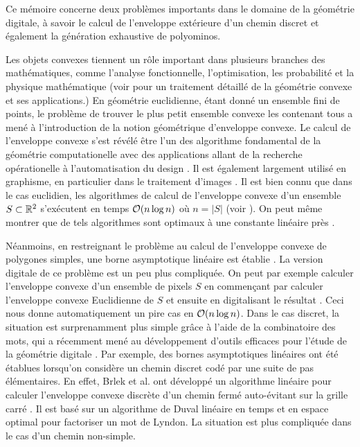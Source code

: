 \begin{introduction}
Ce mémoire concerne deux problèmes importants dans le domaine de la géométrie digitale, à savoir le calcul de l'enveloppe extérieure d'un chemin discret et également la génération exhaustive de polyominos. 



Les objets convexes tiennent un rôle important dans plusieurs branches des mathématiques, comme l'analyse fonctionnelle, l'optimisation, les probabilité et la physique mathématique (voir \cite{Gruber} pour un traitement détaillé de la géométrie convexe et ses applications.) En géométrie euclidienne, étant donné un ensemble fini de points, le problème de trouver le plus petit ensemble convexe les contenant tous a mené à l'introduction de la notion géométrique d'enveloppe convexe. Le calcul de l'enveloppe convexe s'est révélé être l'un des algorithme fondamental de la géométrie computationelle avec des applications allant de la recherche opérationelle \cite{Sherali199483} à l'automatisation du design \cite{kim}. Il est également largement utilisé en graphisme, en particulier dans le traitement d'images \cite{KimLee}. Il est bien connu que dans le cas euclidien, les algorithmes de calcul de l'enveloppe convexe d'un ensemble $S\subset \mathbb{R}^2$ s'exécutent en temps $\mathcal{O}(n\log n)$ où $n=|S|$ (voir \cite{Graham1972132, Chan96}). On peut même montrer que de tels algorithmes sont optimaux à une constante linéaire près \cite{Avis198281,Boas80}.

Néanmoins, en restreignant le problème au calcul de l'enveloppe convexe de polygones simples, une borne asymptotique linéaire est établie  \cite{McCallumAvis, Melkman87}. La version digitale de ce problème est un peu plus compliquée. On peut par exemple calculer l'enveloppe convexe d'un ensemble de pixels $S$ en commençant par calculer l'enveloppe convexe Euclidienne de $S$ et ensuite en digitalisant le résultat \cite{Chaudhuri98}. Ceci nous donne automatiquement un pire cas en $\mathcal{O}(n \log n)$. Dans le cas discret, la situation est surprenamment plus simple grâce à l'aide de la combinatoire des mots, qui a récemment mené au développement d'outils efficaces pour l'étude de la géométrie digitale \cite{thesexavier, blondin12}. Par exemple, des bornes asymptotiques linéaires ont été établues lorsqu'on considère un chemin discret codé par une suite de pas élémentaires. En effet, Brlek et al. ont développé un algorithme linéaire pour calculer l'enveloppe convexe discrète d'un chemin fermé auto-évitant sur la grille carré \cite{blpr09}. Il est basé sur un algorithme de Duval \cite{Duval83} linéaire en temps et en espace optimal pour factoriser un mot de Lyndon. La situation est plus compliquée dans le cas d'un chemin non-simple.


\end{introduction}
